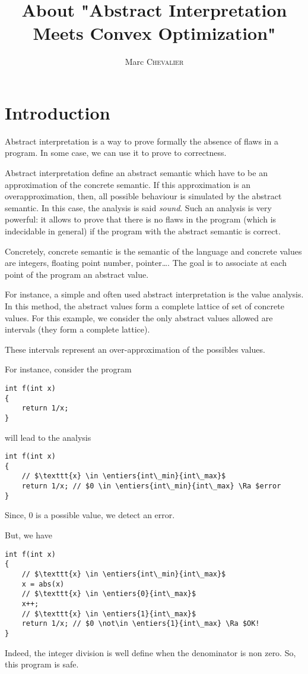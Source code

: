 \documentclass[a4paper, twoside, 10pt]{article}
\title{About "Abstract Interpretation Meets Convex Optimization"}
\author{Marc \textsc{Chevalier}}
\begin{document}
\maketitle

\section{Introduction}

Abstract interpretation is a way to prove formally the absence of flaws in a program. In some case, we can use it to prove to correctness.

Abstract interpretation define an abstract semantic which have to be an approximation of the concrete semantic. If this approximation is an overapproximation, then, all possible behaviour is simulated by the abstract semantic. In this case, the analysis is said \textit{sound}. Such an analysis is very powerful: it allows to prove that there is no flaws in the program (which is indecidable in general) if the program with the abstract semantic is correct.

Concretely, concrete semantic is the semantic of the language and concrete values are integers, floating point number, pointer\dots. The goal is to associate at each point of the program an abstract value.

\bigskip

For instance, a simple and often used abstract interpretation is the value analysis. In this method, the abstract values form a complete lattice of set of concrete values. For this example, we consider the only abstract values allowed are intervals (they form a complete lattice).

These intervals represent an over-approximation of the possibles values.

For instance, consider the program

\begin{verbatim}
int f(int x)
{
    return 1/x;
}
\end{verbatim}
will lead to the analysis
\begin{verbatim}
int f(int x)
{
    // $\texttt{x} \in \entiers{int\_min}{int\_max}$
    return 1/x; // $0 \in \entiers{int\_min}{int\_max} \Ra $error
}
\end{verbatim}
Since, 0 is a possible value, we detect an error.

But, we have
\begin{verbatim}
int f(int x)
{
    // $\texttt{x} \in \entiers{int\_min}{int\_max}$
    x = abs(x)
    // $\texttt{x} \in \entiers{0}{int\_max}$
    x++;
    // $\texttt{x} \in \entiers{1}{int\_max}$
    return 1/x; // $0 \not\in \entiers{1}{int\_max} \Ra $OK!
}
\end{verbatim}
Indeed, the integer division is well define when the denominator is non zero. So, this program is safe.
\end{document}
